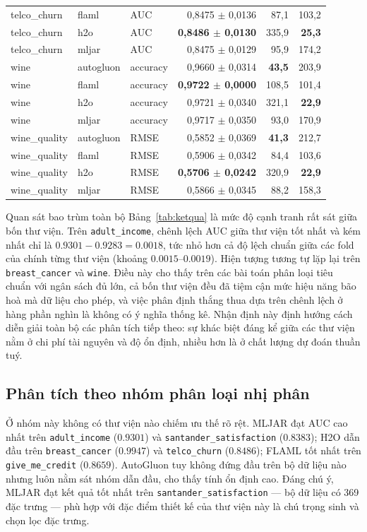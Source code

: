 \begin{longtable}{@{}l l l r r r@{}}
telco\_churn & flaml     & AUC & 0,8475 $\pm$ 0,0136 & 87,1 & 103,2 \\
telco\_churn & h2o       & AUC & \textbf{0,8486 $\pm$ 0,0130} & 335,9 & \textbf{25,3} \\
telco\_churn & mljar     & AUC & 0,8475 $\pm$ 0,0129 & 95,9 & 174,2 \\
\midrule
wine & autogluon & accuracy & 0,9660 $\pm$ 0,0314 & \textbf{43,5} & 203,9 \\
wine & flaml     & accuracy & \textbf{0,9722 $\pm$ 0,0000} & 108,5 & 101,4 \\
wine & h2o       & accuracy & 0,9721 $\pm$ 0,0340 & 321,1 & \textbf{22,9} \\
wine & mljar     & accuracy & 0,9717 $\pm$ 0,0350 & 93,0 & 170,9 \\
\midrule
wine\_quality & autogluon & RMSE & 0,5852 $\pm$ 0,0369 & \textbf{41,3} & 212,7 \\
wine\_quality & flaml     & RMSE & 0,5906 $\pm$ 0,0342 & 84,4 & 103,6 \\
wine\_quality & h2o       & RMSE & \textbf{0,5706 $\pm$ 0,0242} & 320,9 & \textbf{22,9} \\
wine\_quality & mljar     & RMSE & 0,5866 $\pm$ 0,0345 & 88,2 & 158,3 \\
\end{longtable}
\endgroup

Quan sát bao trùm toàn bộ Bảng~\ref{tab:ketqua} là mức độ cạnh tranh rất sát giữa
bốn thư viện. Trên \texttt{adult\_income}, chênh lệch AUC giữa thư viện tốt nhất
và kém nhất chỉ là $0.9301 - 0.9283 = 0.0018$, tức nhỏ hơn cả độ lệch chuẩn giữa
các fold của chính từng thư viện (khoảng $0.0015$--$0.0019$). Hiện tượng tương tự
lặp lại trên \texttt{breast\_cancer} và \texttt{wine}. Điều này cho thấy trên các
bài toán phân loại tiêu chuẩn với ngân sách đủ lớn, cả bốn thư viện đều đã tiệm
cận mức hiệu năng bão hoà mà dữ liệu cho phép, và việc phân định thắng thua dựa
trên chênh lệch ở hàng phần nghìn là không có ý nghĩa thống kê. Nhận định này định
hướng cách diễn giải toàn bộ các phân tích tiếp theo: sự khác biệt đáng kể giữa
các thư viện nằm ở chi phí tài nguyên và độ ổn định, nhiều hơn là ở chất lượng dự
đoán thuần tuý.

\subsection{Phân tích theo nhóm phân loại nhị phân}
Ở nhóm này không có thư viện nào chiếm ưu thế rõ rệt. MLJAR đạt AUC cao nhất trên
\texttt{adult\_income} ($0.9301$) và \texttt{santander\_satisfaction} ($0.8383$);
H2O dẫn đầu trên \texttt{breast\_cancer} ($0.9947$) và \texttt{telco\_churn}
($0.8486$); FLAML tốt nhất trên \texttt{give\_me\_credit} ($0.8659$). AutoGluon
tuy không đứng đầu trên bộ dữ liệu nào nhưng luôn nằm sát nhóm dẫn đầu, cho thấy
tính ổn định cao. Đáng chú ý, MLJAR đạt kết quả tốt nhất trên
\texttt{santander\_satisfaction} --- bộ dữ liệu có 369 đặc trưng --- phù hợp với
đặc điểm thiết kế của thư viện này là chú trọng sinh và chọn lọc đặc trưng.

